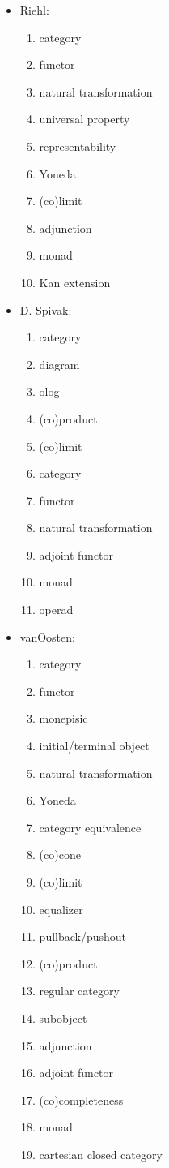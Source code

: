 \documentclass[11pt,openany]{book}
\begin{document}
\begin{itemize}
\item Riehl:~\cite{Riehl:2017:CatTheory}
\begin{enumerate}
  \item category
  \item functor
  \item natural transformation
  \item universal property
  \item representability
  \item Yoneda
  \item (co)limit
  \item adjunction
  \item monad
  \item Kan extension
\end{enumerate}

\item D. Spivak:~\cite{Spivak:2013:CatTheoryForScientists}
\begin{enumerate}
  \item category
  \item diagram
  \item olog
  \item (co)product
  \item (co)limit
  \item category
  \item functor
  \item natural transformation
  \item adjoint functor
  \item monad
  \item operad
\end{enumerate}

\item vanOosten:\cite{VanOosten:2002:CatTheory}
\begin{enumerate}
  \item category
  \item functor
  \item monepisic
  \item initial/terminal object
  \item natural transformation
  \item Yoneda
  \item category equivalence
  \item (co)cone
  \item (co)limit
  \item equalizer
  \item pullback/pushout
  \item (co)product
  \item regular category
  \item subobject
  \item adjunction
  \item adjoint functor
  \item (co)completeness
  \item monad
  \item cartesian closed category
 \end{enumerate}
\end{itemize}
  
\end{document}
